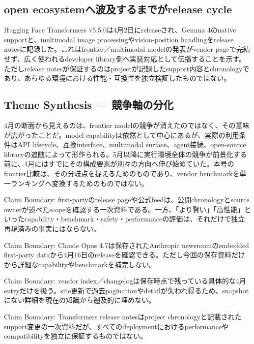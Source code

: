 \subsection{open ecosystemへ波及するまでがrelease cycle}

Hugging Face Transformers v5.5.0は4月2日にreleaseされ、Gemma 4のnative supportと、multimodal image processingやvision-position handlingをrelease notesに記録した。これはfrontier／multimodal modelの発表がvendor pageで完結せず、広く使われるdeveloper library側へ実装対応として伝播することを示す。ただしrelease notesが保証するのはprojectが記録したsupport内容とchronologyであり、あらゆる環境における性能・互換性を独立検証したものではない。\autocite{src-6ddeedd7665f}


\subsection{Theme Synthesis — 競争軸の分化}

4月の断面から見えるのは、frontier modelの競争が消えたのではなく、その意味が広がったことだ。model capabilityは依然として中心にあるが、実際の利用条件はAPI lifecycle、互換interface、multimodal surface、agent接続、open-source libraryの追随によって形作られる。5月以降に実行環境全体の競争が前景化する前に、4月にはすでにその構成要素が別々の方向へ伸び始めていた。本号のfrontier比較は、その分岐点を捉えるためのものであり、vendor benchmarkを単一ランキングへ変換するためのものではない。\autocite{src-6ddeedd7665f,src-9156c37fb1c2,src-a24fd97eb3d0,src-dfe7e0c6ff39,src-e547d0d8cbe3,src-eac8dfbeb78c}


\begin{claimboundary}
Claim Boundary: first-partyのrelease pageや公式feedは、公開chronologyとsource ownerが述べたscopeを確認する一次資料である。一方、「より賢い」「高性能」といったcapability・benchmark・safety・performanceの評価は、それだけで独立再現済みの事実にはならない。\autocite{src-a07eb39dec04,src-dfe7e0c6ff39}
\end{claimboundary}

\begin{claimboundary}
Claim Boundary: Claude Opus 4.7は保存されたAnthropic newsroomのembedded first-party dataから4月16日のreleaseを確認できる。ただし今回の保存資料だけから詳細なcapabilityやbenchmarkを補完しない。\autocite{src-f6aa679babd7}
\end{claimboundary}

\begin{claimboundary}
Claim Boundary: vendor index／changelogは保存時点で残っている具体的な4月entryだけを扱う。site更新で過去paginationやdetailが失われ得るため、snapshotにない詳細を現在の知識から遡及的に埋めない。\autocite{src-9156c37fb1c2,src-a24fd97eb3d0,src-e547d0d8cbe3,src-eac8dfbeb78c}
\end{claimboundary}

\begin{claimboundary}
Claim Boundary: Transformers release notesはproject chronologyと記載されたsupport変更の一次資料だが、すべてのdeploymentにおけるperformanceやcompatibilityを独立に保証するものではない。\autocite{src-6ddeedd7665f}
\end{claimboundary}
